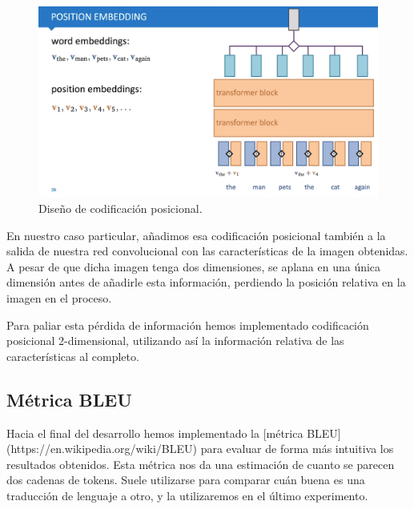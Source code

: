 \documentclass[a4paper, 20pt, dvipsnames]{article}
\begin{document}

\begin{figure}[H]
	\centering
	\includegraphics[scale=0.15]{fig/positional}
	\caption{Diseño de codificación posicional.}
\end{figure}


En nuestro caso particular, añadimos esa codificación posicional también a la
salida de nuestra red convolucional con las características de la imagen
obtenidas. A pesar de que dicha imagen tenga dos dimensiones, se aplana en una
única dimensión antes de añadirle esta información, perdiendo la posición
relativa en la imagen en el proceso.

Para paliar esta pérdida de información hemos implementado codificación
posicional 2-dimensional, utilizando así la información relativa de las
características al completo.


\subsection{Métrica BLEU}

Hacia el final del desarrollo hemos implementado la [métrica
BLEU](https://en.wikipedia.org/wiki/BLEU) para evaluar de forma más intuitiva
los resultados obtenidos. Esta métrica nos da una estimación de cuanto se
parecen dos cadenas de tokens. Suele utilizarse para comparar cuán buena es una
traducción de lenguaje a otro, y la utilizaremos en el último experimento.
\end{document}
